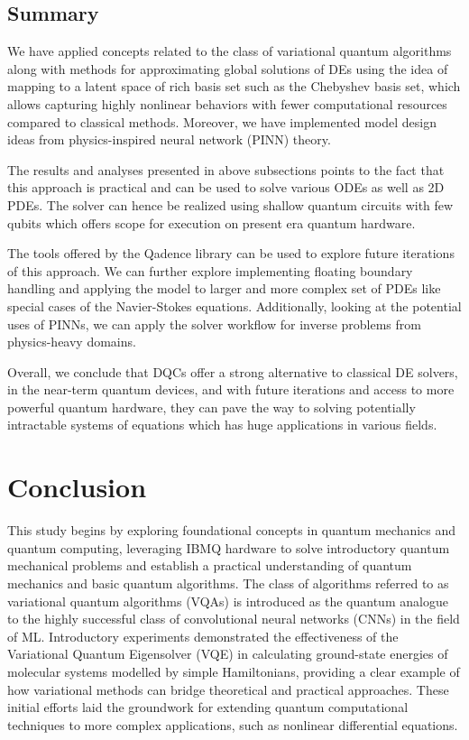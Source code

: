 \documentclass[11pt,a4paper]{article}
\begin{document}
{\subsection{Summary}
We have applied concepts related to the class of variational quantum algorithms along with methods for approximating global solutions of DEs using the idea of mapping to a latent space of rich basis set such as the Chebyshev basis set, which allows capturing highly nonlinear behaviors with fewer computational resources compared to classical methods. Moreover, we have implemented model design ideas from physics-inspired neural network (PINN) theory.

The results and analyses presented in above subsections points to the fact that this approach is practical and can be used to solve various ODEs as well as 2D PDEs. The solver can hence be realized using shallow quantum circuits with few qubits which offers scope for execution on present era quantum hardware.

The tools offered by the Qadence library can be used to explore future iterations of this approach. We can further explore implementing floating boundary handling and applying the model to larger and more complex set of PDEs like special cases of the Navier-Stokes equations. Additionally, looking at the potential uses of PINNs, we can apply the solver workflow for inverse problems from physics-heavy domains.

Overall, we conclude that DQCs offer a strong alternative to classical DE solvers, in the near-term quantum devices, and with future iterations and access to more powerful quantum hardware, they can pave the way to solving potentially intractable systems of equations which has huge applications in various fields.

\section{Conclusion}

This study begins by exploring foundational concepts in quantum mechanics and quantum computing, leveraging IBMQ hardware to solve introductory quantum mechanical problems and establish a practical understanding of quantum mechanics and basic quantum algorithms. The class of algorithms referred to as variational quantum algorithms (VQAs) is introduced as the quantum analogue to the highly successful class of convolutional neural networks (CNNs) in the field of ML. Introductory experiments demonstrated the effectiveness of the Variational Quantum Eigensolver (VQE) in calculating ground-state energies of molecular systems modelled by simple Hamiltonians, providing a clear example of how variational methods can bridge theoretical and practical approaches. These initial efforts laid the groundwork for extending quantum computational techniques to more complex applications, such as nonlinear differential equations.

}
\end{document}
